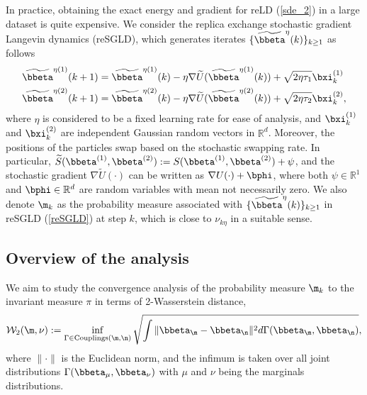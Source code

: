 In practice, obtaining the exact energy and gradient for reLD (\ref{sde_2}) in a large dataset is quite expensive. We consider the replica exchange stochastic gradient Langevin dynamics (reSGLD), which generates iterates $\{\widetilde \bbeta^{\eta}(k)\}_{k\ge 1}$ as follows
\begin{equation}
\label{reSGLD}
       \begin{split}
           \widetilde \bbeta^{\eta(1)}(k+1) &= \widetilde \bbeta^{\eta(1)}(k)- \eta \nabla \widetilde U (\widetilde \bbeta^{\eta(1)}(k))+\sqrt{2\eta\tau_1} \bxi_k^{(1)}\\
    \widetilde \bbeta^{\eta(2)}(k+1) &= \widetilde \bbeta^{\eta(2)}(k) - \eta\nabla \widetilde U(\widetilde \bbeta^{\eta(2)}(k))+\sqrt{2\eta\tau_2} \bxi_k^{(2)},\\
       \end{split}
   \end{equation}
where $\eta$ is considered to be a fixed learning rate for ease of analysis, and $\bxi_k^{(1)}$ and $\bxi_k^{(2)}$ are independent Gaussian random vectors in $\mathbb{R}^d$. Moreover, the positions of the particles swap based on the stochastic swapping rate. In particular, $\widetilde S(\bbeta^{(1)}, \bbeta^{(2)}):=S(\bbeta^{(1)}, \bbeta^{(2)})+\psi$, and the stochastic gradient $\nabla\widetilde U(\cdot)$ can be written as $\nabla U(\cdot)+\bphi$, where both $\psi\in \mathbb{R}^1$ and $\bphi\in\mathbb{R}^d$ are random variables with mean not necessarily zero. We also denote $\m_k$ as the probability measure associated with $\{\widetilde \bbeta^{\eta}(k)\}_{k\ge 1}$ in reSGLD (\ref{reSGLD}) at step $k$, which is close to $\nu_{k\eta}$ in a suitable sense.


\subsection{Overview of the analysis}


We aim to study the convergence analysis of the probability measure $\m_{k}$ to the invariant measure $\pi$ in terms of 2-Wasserstein distance,
\begin{equation}
\label{w2}
    \mathcal{W}_2(\m, \nu):=\inf_{\Gamma\in \text{Couplings}(\m, \n)}{\sqrt{\int\|\bbeta_{\m}-\bbeta_{\n}\|^2 d \Gamma(\bbeta_{\m},\bbeta_{\n})}},
\end{equation}
where $\|\cdot\|$ is the Euclidean norm, and the infimum is taken over all joint distributions $\Gamma(\bbeta_{\mu}, \bbeta_{\nu})$ with $\mu$ and $\nu$ being the marginals distributions.

